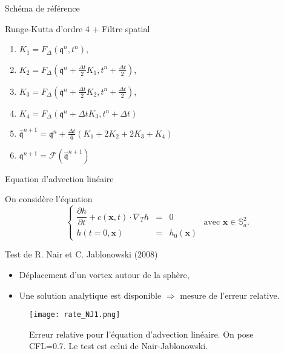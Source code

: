 \documentclass[11pt]{beamer}
\begin{document}
\begin{frame}{Schéma de référence}
\begin{block}{Runge-Kutta d'ordre 4 + Filtre spatial
}
\begin{enumerate}
\item $K_1 = F_{\Delta}(\mathfrak{q}^n, t^n)$,
\item $K_2 = F_{\Delta}(\mathfrak{q}^n + \frac{\Delta t}{2} K_1, t^n + \frac{\Delta t}{2})$,
\item $K_3 = F_{\Delta}(\mathfrak{q}^n + \frac{\Delta t}{2} K_2, t^n + \frac{\Delta t}{2})$,
\item $K_4 = F_{\Delta}(\mathfrak{q}^n + \Delta t K_3, t^n + \Delta t)$
\item $\hat{\mathfrak{q}}^{n+1} = \mathfrak{q}^n + \frac{\Delta t}{6} \left( K_1 + 2 K_2 + 2 K_3 + K_4 \right)$
\item $\mathfrak{q}^{n+1} = \mathcal{F}(\hat{\mathfrak{q}}^{n+1})$
\end{enumerate}
\end{block}
\end{frame}









\begin{frame}{Equation d'advection linéaire}

On considère l'équation
$$
\left\lbrace
\begin{array}{rcl}
\dfrac{\partial h}{\partial t} + c(\mathbf{x},t) \cdot \nabla_T h & = & 0  \\
h(t=0,\mathbf{x}) & = & h_0(\mathbf{x})
\end{array}
\right. \text{ avec } \mathbf{x} \in \mathbb{S}_a^2.
$$

\begin{exampleblock}{Test de R. Nair et C. Jablonowski (2008)}
\begin{itemize}
\item Déplacement d'un vortex autour de la sphère,
\item Une solution analytique est disponible $\Rightarrow$ mesure de l'erreur relative.
\end{itemize}
\end{exampleblock}
\end{frame}


\begin{frame}
\begin{figure}
\begin{center}
\texttt{[image: rate\_NJ1.png]}
\end{center}
\caption{Erreur relative pour l'équation d'advection linéaire. On pose CFL=0.7. Le test est celui de Nair-Jablonowski.}
\end{figure}
\end{frame}
\end{document}
